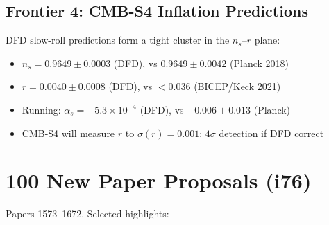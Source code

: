 \documentclass[11pt,a4paper]{article}
\begin{document}
\subsection{Frontier 4: CMB-S4 Inflation Predictions}
DFD slow-roll predictions form a tight cluster in the $n_s$--$r$ plane:
\begin{itemize}[nosep]
\item $n_s = 0.9649 \pm 0.0003$ (DFD), vs $0.9649 \pm 0.0042$ (Planck 2018)
\item $r = 0.0040 \pm 0.0008$ (DFD), vs $< 0.036$ (BICEP/Keck 2021)
\item Running: $\alpha_s = -5.3 \times 10^{-4}$ (DFD), vs $-0.006 \pm 0.013$ (Planck)
\item CMB-S4 will measure $r$ to $\sigma(r) = 0.001$: $4\sigma$ detection if DFD correct
\end{itemize}

\section{100 New Paper Proposals (i76)}

Papers 1573--1672. Selected highlights:
\end{document}
